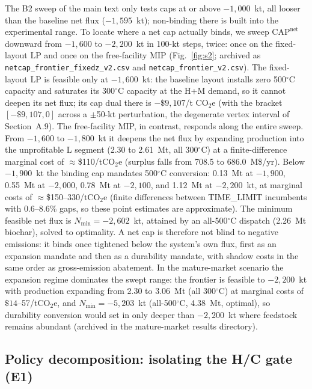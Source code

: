 The B2 sweep of the main text only tests caps at or above $-1{,}000$~kt, all
looser than the baseline net flux ($-1{,}595$~kt); non-binding there is built
into the experimental range. To locate where a net cap actually binds, we sweep
$\mathrm{CAP}^{\mathrm{net}}$ downward from $-1{,}600$ to $-2{,}200$~kt in
100-kt steps, twice: once on the fixed-layout LP and once on the
free-facility MIP (Fig.~\ref{fig:s2}; archived as
\texttt{netcap\_frontier\_fixedz\_v2.csv} and
\texttt{netcap\_frontier\_v2.csv}). The fixed-layout LP is feasible only at
$-1{,}600$~kt: the baseline layout installs zero 500$^\circ$C capacity and
saturates its 300$^\circ$C capacity at the H+M demand, so it cannot deepen its
net flux; its cap dual there is $-\$9{,}107$/t CO$_2$e (with the bracket
$[-\$9{,}107, 0]$ across a $\pm$50-kt perturbation, the degenerate vertex
interval of Section~A.9). The free-facility MIP, in contrast, responds along
the entire sweep. From $-1{,}600$ to $-1{,}800$~kt it deepens the net flux by
expanding production into the unprofitable L segment (2.30 to 2.61~Mt, all
300$^\circ$C) at a finite-difference marginal cost of $\approx$\$110/tCO$_2$e
(surplus falls from 708.5 to 686.0~M\$/yr). Below $-1{,}900$~kt the binding
cap mandates 500$^\circ$C conversion: 0.13~Mt at $-1{,}900$, 0.55~Mt at
$-2{,}000$, 0.78~Mt at $-2{,}100$, and 1.12~Mt at $-2{,}200$~kt, at marginal
costs of $\approx$\$150--330/tCO$_2$e (finite differences between TIME\_LIMIT
incumbents with 0.6--8.6\% gaps, so these point estimates are approximate).
The minimum feasible net flux is $N_{\min}=-2{,}602$~kt, attained by an
all-500$^\circ$C dispatch (2.26~Mt biochar), solved to optimality. A net cap
is therefore not blind to negative emissions: it binds once tightened below
the system's own flux, first as an expansion mandate and then as a durability
mandate, with shadow costs in the same order as gross-emission abatement. In the
mature-market scenario the expansion regime dominates the swept range: the
frontier is feasible to $-2{,}200$~kt with production expanding from 2.30 to
3.06~Mt (all 300$^\circ$C) at marginal costs of $\$14$--57/tCO$_2$e, and
$N_{\min}=-5{,}203$~kt (all-500$^\circ$C, 4.38~Mt, optimal), so durability
conversion would set in only deeper than $-2{,}200$~kt where feedstock
remains abundant (archived in the mature-market results directory).

\subsection{Policy decomposition: isolating the H/C gate (E1)}


